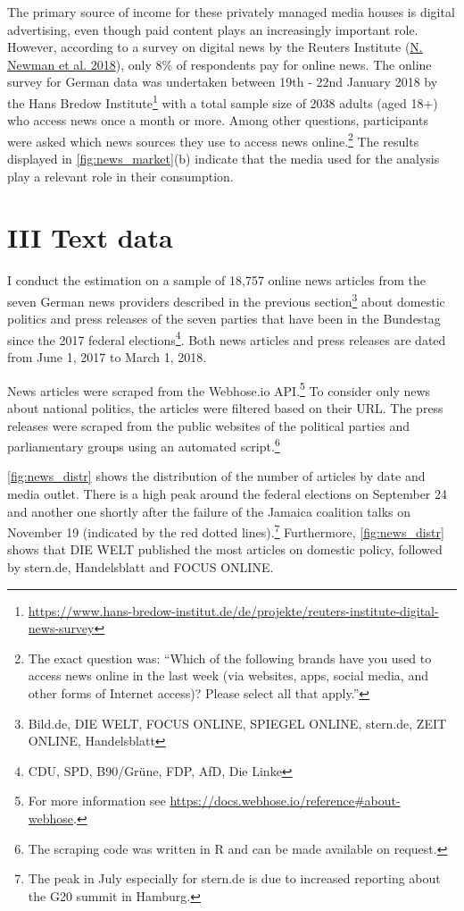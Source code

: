 \documentclass[
]{article}
\begin{document}
The primary source of income for these privately managed media houses is
digital advertising, even though paid content plays an increasingly
important role. However, according to a survey on digital news by the
Reuters Institute (\protect\hyperlink{ref-newman_reuters_2018}{N. Newman
et al. 2018}), only 8\% of respondents pay for online news. The online
survey for German data was undertaken between 19th - 22nd January 2018
by the Hans Bredow Institute\footnote{\url{https://www.hans-bredow-institut.de/de/projekte/reuters-institute-digital-news-survey}}
with a total sample size of 2038 adults (aged 18+) who access news once
a month or more. Among other questions, participants were asked which
news sources they use to access news online.\footnote{The exact question
  was: ``Which of the following brands have you used to access news
  online in the last week (via websites, apps, social media, and other
  forms of Internet access)? Please select all that apply.''} The
results displayed in \autoref{fig:news_market}(b) indicate that the
media used for the analysis play a relevant role in their consumption.

\hypertarget{iii-text-data}{%
\section{III Text data}\label{iii-text-data}}

I conduct the estimation on a sample of 18,757 online news articles from
the seven German news providers described in the previous
section\footnote{Bild.de, DIE WELT, FOCUS ONLINE, SPIEGEL ONLINE,
  stern.de, ZEIT ONLINE, Handelsblatt} about domestic politics and press
releases of the seven parties that have been in the Bundestag since the
2017 federal elections\footnote{CDU, SPD, B90/Grüne, FDP, AfD, Die Linke}.
Both news articles and press releases are dated from June 1, 2017 to
March 1, 2018.

News articles were scraped from the Webhose.io API.\footnote{For more
  information see
  \url{https://docs.webhose.io/reference\#about-webhose}.} To consider
only news about national politics, the articles were filtered based on
their URL. The press releases were scraped from the public websites of
the political parties and parliamentary groups using an automated
script.\footnote{The scraping code was written in R and can be made
  available on request.}

\autoref{fig:news_distr} shows the distribution of the number of
articles by date and media outlet. There is a high peak around the
federal elections on September 24 and another one shortly after the
failure of the Jamaica coalition talks on November 19 (indicated by the
red dotted lines).\footnote{The peak in July especially for stern.de is
  due to increased reporting about the G20 summit in Hamburg.}
Furthermore, \autoref{fig:news_distr} shows that DIE WELT published the
most articles on domestic policy, followed by stern.de, Handelsblatt and
FOCUS ONLINE.
\end{document}
